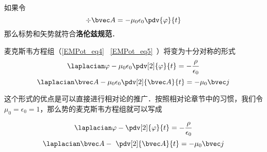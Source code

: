 
\begin{issues}
\issueDraft
\end{issues}


如果令
\begin{equation}
\div \bvec A = -\mu_0 \epsilon_0 \pdv{\varphi}{t}
\end{equation}
那么标势和矢势就符合\textbf{洛伦兹规范}． 

麦克斯韦方程组（\autoref{EMPot_eq4}~ \autoref{EMPot_eq5}~）将变为十分对称的形式
\begin{equation}\label{LoGaug_eq1}
\laplacian \varphi - \mu_0\epsilon_0 \pdv[2]{\varphi}{t} = -\frac{\rho}{\epsilon_0}
\end{equation}
\begin{equation}\label{LoGaug_eq2}
\laplacian \bvec A - \mu_0\epsilon_0 \pdv[2]{\bvec A}{t} = -\mu_0 \bvec j
\end{equation}

这个形式的优点是可以直接进行相对论的推广．按照相对论章节中的习惯，我们令$\mu_0=\epsilon_0=1$，那么势的麦克斯韦方程组就可以写成

\begin{equation}
\laplacian \varphi -  \pdv[2]{\varphi}{t} = -\frac{\rho}{\epsilon_0}
\end{equation}
\begin{equation}\label{LoGaug_eq2}
\laplacian \bvec A - \ \pdv[2]{\bvec A}{t} = -\mu_0 \bvec j
\end{equation}




